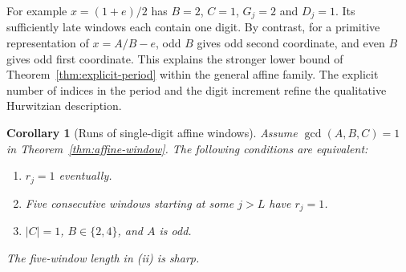 \documentclass[11pt]{amsart}
\newtheorem{corollary}[theorem]{Corollary}
\theoremstyle{definition}
\theoremstyle{remark}
\numberwithin{equation}{section}
\begin{document}
For example $x=(1+e)/2$ has $B=2$, $C=1$, $G_j=2$ and $D_j=1$.
Its sufficiently late windows each contain one digit. By contrast,
for a primitive representation of $x=A/B-e$, odd $B$ gives odd
second coordinate, and even $B$ gives odd first coordinate. This
explains the stronger lower bound of Theorem~\ref{thm:explicit-period}
within the general affine family. The explicit number of indices in
the period and the digit increment refine the qualitative
Hurwitzian description.


\begin{corollary}[Runs of single-digit affine windows]\label{cor:affine-single}
Assume $\gcd(A,B,C)=1$ in Theorem~\ref{thm:affine-window}.
The following conditions are equivalent:
\begin{enumerate}
\item[(i)] $r_j=1$ eventually.
\item[(ii)] Five consecutive windows starting at some $j>L$ have $r_j=1$.
\item[(iii)] $|C|=1$, $B\in\{2,4\}$, and $A$ is odd.
\end{enumerate}
The five-window length in (ii) is sharp.
\end{corollary}
\end{document}
